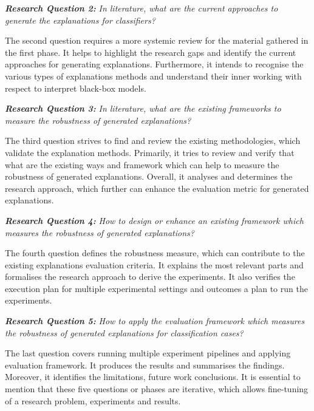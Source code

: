 \documentclass[english]{tktltiki2}
\theoremstyle{definition}
\theoremstyle{remark}
\begin{document}
\textbf{\textit{Research Question 2:}}
\textit{In literature, what are the current approaches to generate the explanations for classifiers?}

The second question requires a more systemic review for the material gathered in the first phase. It helps to highlight the research gaps and identify the current approaches for generating explanations. Furthermore, it intends to recognise the various types of explanations methods and understand their inner working with respect to interpret black-box models.

\textbf{\textit{Research Question 3:}}
\textit{In literature, what are the existing frameworks to measure the robustness of generated explanations?}

The third question strives to find and review the existing methodologies, which validate the explanation methods. Primarily, it tries to review and verify that what are the existing ways and framework which can help to measure the robustness of generated explanations. Overall, it analyses and determines the research approach, which further can enhance the evaluation metric for generated explanations.

\textbf{\textit{Research Question 4:}}
\textit{How to design or enhance an existing framework which measures the robustness of generated explanations?}

The fourth question defines the robustness measure, which can contribute to the existing explanations evaluation criteria. It explains the most relevant parts and formalises the research approach to derive the experiments. It also verifies the execution plan for multiple experimental settings and outcomes a plan to run the experiments.


\textbf{\textit{Research Question 5:}}
\textit{How to apply the evaluation framework which measures the robustness of generated explanations for classification cases?}

The last question covers running multiple experiment pipelines and applying evaluation framework. It produces the results and summarises the findings. Moreover, it identifies the limitations, future work conclusions. It is essential to mention that these five questions or phases are iterative, which allows fine-tuning of a research problem, experiments and results. 
\end{document}
